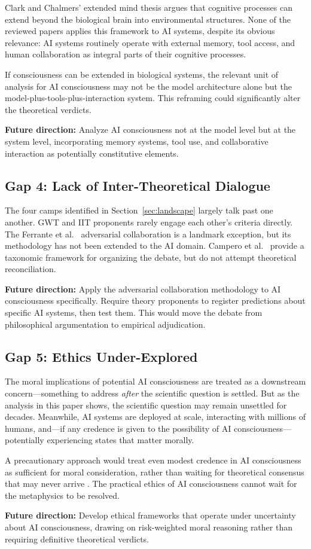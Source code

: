 Clark and Chalmers' extended mind thesis \cite{clark1998extended} argues that cognitive
processes can extend beyond the biological brain into environmental structures. None of the
reviewed papers applies this framework to AI systems, despite its obvious relevance: AI
systems routinely operate with external memory, tool access, and human collaboration as
integral parts of their cognitive processes.

If consciousness can be extended in biological systems, the relevant unit of analysis for
AI consciousness may not be the model architecture alone but the model-plus-tools-plus-interaction
system. This reframing could significantly alter the theoretical verdicts.

\textbf{Future direction:} Analyze AI consciousness not at the model level but at the
system level, incorporating memory systems, tool use, and collaborative interaction as
potentially constitutive elements.

\subsection{Gap 4: Lack of Inter-Theoretical Dialogue}

The four camps identified in Section~\ref{sec:landscape} largely talk past one another.
GWT and IIT proponents rarely engage each other's criteria directly. The Ferrante et al.\
\cite{ferrante2025adversarial} adversarial collaboration is a landmark exception, but
its methodology has not been extended to the AI domain. Campero et al.\
\cite{campero2025taxonomy} provide a taxonomic framework for organizing the debate, but
do not attempt theoretical reconciliation.

\textbf{Future direction:} Apply the adversarial collaboration methodology to AI consciousness
specifically. Require theory proponents to register predictions about specific AI systems,
then test them. This would move the debate from philosophical argumentation to empirical
adjudication.

\subsection{Gap 5: Ethics Under-Explored}

The moral implications of potential AI consciousness are treated as a downstream concern---something
to address \textit{after} the scientific question is settled. But as the analysis in this paper
shows, the scientific question may remain unsettled for decades. Meanwhile, AI systems are
deployed at scale, interacting with millions of humans, and---if any credence is given to the
possibility of AI consciousness---potentially experiencing states that matter morally.

A precautionary approach would treat even modest credence in AI consciousness as sufficient
for moral consideration, rather than waiting for theoretical consensus that may never arrive
\cite{butlin2023consciousness}. The practical ethics of AI consciousness cannot wait for the
metaphysics to be resolved.

\textbf{Future direction:} Develop ethical frameworks that operate under uncertainty about
AI consciousness, drawing on risk-weighted moral reasoning rather than requiring definitive
theoretical verdicts.
